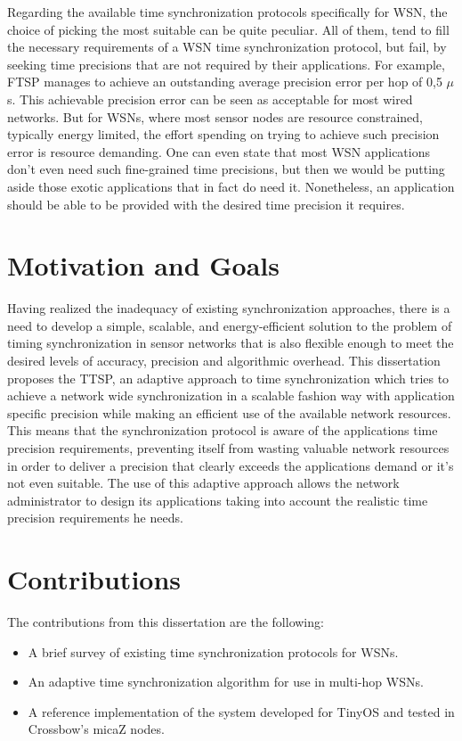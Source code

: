 Regarding the available time synchronization protocols specifically for WSN, the choice of picking the most suitable can be quite peculiar. All of them, tend to fill the necessary requirements of a WSN time synchronization protocol, but fail, by seeking time precisions that are not required by their applications. For example, \ac{FTSP} \cite{Maroti04:FTSP} manages to achieve an outstanding average precision error per hop of 0,5 $\mu$s. This achievable precision error can be seen as acceptable for most wired networks. But for WSNs, where most sensor nodes are resource constrained, typically energy limited, the effort spending on trying to achieve such precision error is resource demanding. One can even state that most WSN applications don't even need such fine-grained time precisions, but then we would be putting aside those exotic applications that in fact do need it. Nonetheless, an application should be able to be provided with the desired time precision
it requires.

\section{Motivation and Goals}
Having realized the inadequacy of existing synchronization approaches, there is a need to develop a simple, scalable, and
energy-efficient solution to the problem of timing synchronization in sensor networks that is also flexible enough to meet the desired levels of accuracy, precision and algorithmic overhead.
This dissertation proposes the \ac{TTSP}, an adaptive approach to time synchronization which tries to achieve a network wide synchronization in a scalable fashion way with application specific precision while making an efficient use of the available network resources. This means that the synchronization protocol is aware of the applications time precision requirements, preventing itself from wasting valuable network resources in order to deliver a precision that clearly exceeds the applications demand or it's not even suitable. The use of this adaptive approach allows the network administrator to design its applications taking into account the realistic time precision requirements he needs.

\section{Contributions}
The contributions from this dissertation are the following:
\begin{itemize}
\item A brief survey of existing time synchronization protocols for WSNs.
\item An adaptive time synchronization algorithm for use in multi-hop WSNs.
\item A reference implementation of the system developed for TinyOS and tested in Crossbow's micaZ nodes.
\end{itemize}

